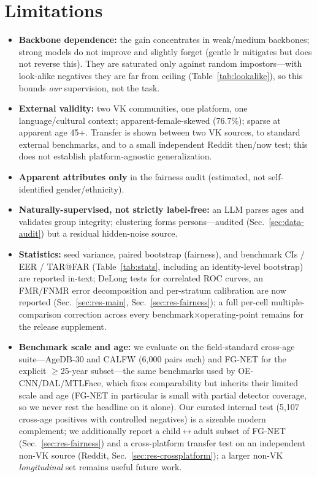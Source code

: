 \documentclass[journal]{IEEEtran}
\begin{document}
\section{Limitations}\label{sec:limitations}
\begin{itemize}[leftmargin=1.2em]
\item \textbf{Backbone dependence:} the gain concentrates in weak/medium backbones; strong models do not improve and slightly forget (gentle lr mitigates but does not reverse this). They are saturated only against random impostors---with look-alike negatives they are far from ceiling (Table~\ref{tab:lookalike}), so this bounds \emph{our} supervision, not the task.
\item \textbf{External validity:} two VK communities, one platform, one language/cultural context; apparent-female-skewed (76.7\%); sparse at apparent age 45+. Transfer is shown between two VK sources, to standard external benchmarks, and to a small independent Reddit then/now test; this does not establish platform-agnostic generalization.
\item \textbf{Apparent attributes only} in the fairness audit (estimated, not self-identified gender/ethnicity).
\item \textbf{Naturally-supervised, not strictly label-free:} an LLM parses ages and validates group integrity; clustering forms persons---audited (Sec.~\ref{sec:data-audit}) but a residual hidden-noise source.
\item \textbf{Statistics:} seed variance, paired bootstrap (fairness), and benchmark CIs / EER / TAR@FAR (Table~\ref{tab:stats}, including an identity-level bootstrap) are reported in-text; DeLong tests for correlated ROC curves, an FMR/FNMR error decomposition and per-stratum calibration are now reported (Sec.~\ref{sec:res-main}, Sec.~\ref{sec:res-fairness}); a full per-cell multiple-comparison correction across every benchmark$\times$operating-point remains for the release supplement.
\item \textbf{Benchmark scale and age:} we evaluate on the field-standard cross-age suite---AgeDB-30 and CALFW (6{,}000 pairs each) and FG-NET for the explicit $\geq$25-year subset---the same benchmarks used by OE-CNN/DAL/MTLFace, which fixes comparability but inherits their limited scale and age (FG-NET in particular is small with partial detector coverage, so we never rest the headline on it alone). Our curated internal test (5{,}107 cross-age positives with controlled negatives) is a sizeable modern complement; we additionally report a child$\leftrightarrow$adult subset of FG-NET (Sec.~\ref{sec:res-fairness}) and a cross-platform transfer test on an independent non-VK source (Reddit, Sec.~\ref{sec:res-crossplatform}); a larger non-VK \emph{longitudinal} set remains useful future work.

\end{itemize}
\end{document}
